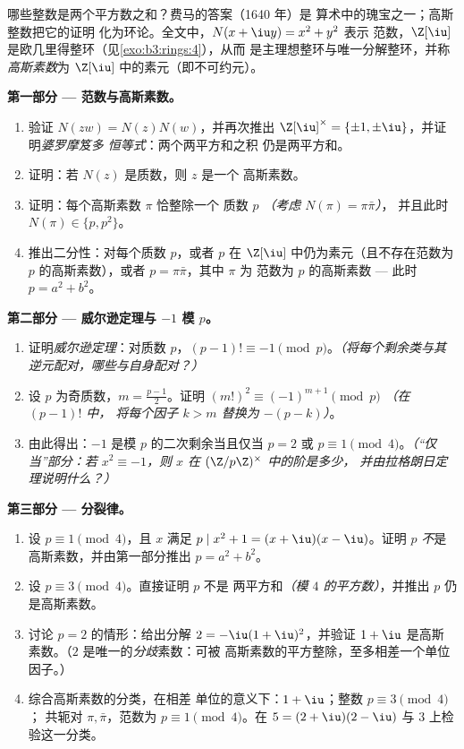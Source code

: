 \begin{problem}\label{pb:b3:rings:1}
哪些整数是两个平方数之和？费马的答案（1640 年）是
算术中的瑰宝之一；高斯整数把它的证明
化为环论。全文中，$N(x + \iu y) = x^2 + y^2$ 表示
范数，$\Z[\iu]$ 是欧几里得整环（见\cref{exo:b3:rings:4}），从而
是主理想整环与唯一分解整环，并称\emph{高斯素数}为
$\Z[\iu]$ 中的素元（即不可约元）。

\medskip
\noindent\textbf{第一部分 --- 范数与高斯素数。}
\begin{enumerate}
  \item 验证 $N(zw) = N(z)N(w)$，并再次推出 $\Z[\iu]^\times =
        \{\pm1, \pm\iu\}$，并证明\emph{婆罗摩笈多
        恒等式}：两个两平方和之积
        仍是两平方和。
  \item 证明：若 $N(z)$ 是质数，则 $z$ 是一个
        高斯素数。
  \item 证明：每个高斯素数 $\pi$ 恰整除一个
        质数 $p$ \emph{（考虑 $N(\pi) = \pi\bar\pi$）}，
        并且此时 $N(\pi) \in \{p, p^2\}$。
  \item 推出二分性：对每个质数 $p$，或者 $p$
        在 $\Z[\iu]$ 中仍为素元（且不存在范数为
        $p$ 的高斯素数），或者 $p = \pi\bar\pi$，其中 $\pi$ 为
        范数为 $p$ 的高斯素数 --- 此时 $p = a^2 + b^2$。
\end{enumerate}

\medskip
\noindent\textbf{第二部分 --- 威尔逊定理与 $-1$ 模
$p$。}
\begin{enumerate}[resume]
  \item 证明\emph{威尔逊定理}：对质数 $p$，$(p-1)!
        \equiv -1 \pmod p$。\emph{（将每个剩余类与其
        逆元配对，哪些与自身配对？）}
  \item 设 $p$ 为奇质数，$m = \frac{p-1}2$。证明
        $(m!)^2 \equiv (-1)^{m+1} \pmod p$ \emph{（在 $(p-1)!$ 中，
        将每个因子 $k > m$ 替换为 $-(p - k)$）}。
  \item 由此得出：$-1$ 是模 $p$ 的二次剩余当且仅当 $p = 2$ 或 $p
        \equiv 1 \pmod 4$。\emph{（“仅当”部分：若 $x^2
        \equiv -1$，则 $x$ 在 $(\Z/p\Z)^\times$ 中的阶是多少，
        并由拉格朗日定理说明什么？）}
\end{enumerate}

\medskip
\noindent\textbf{第三部分 --- 分裂律。}
\begin{enumerate}[resume]
  \item 设 $p \equiv 1 \pmod 4$，且 $x$ 满足 $p \mid x^2 + 1 =
        (x + \iu)(x - \iu)$。证明 $p$ \emph{不}是
        高斯素数，并由第一部分推出 $p = a^2 + b^2$。
  \item 设 $p \equiv 3 \pmod 4$。直接证明 $p$ 不是
        两平方和\emph{（模 $4$ 的平方数）}，并推出
        $p$ 仍是高斯素数。
  \item 讨论 $p = 2$ 的情形：给出分解 $2 =
        -\iu(1+\iu)^2$，并验证 $1 + \iu$ 是高斯
        素数。（$2$ 是唯一的\emph{分歧}素数：可被
        高斯素数的平方整除，至多相差一个单位因子。）
  \item 综合高斯素数的分类，在相差
        单位的意义下：$1 + \iu$；整数 $p \equiv 3 \pmod 4$；
        共轭对 $\pi, \bar\pi$，范数为 $p \equiv 1 \pmod
        4$。在 $5 = (2+\iu)(2-\iu)$ 与 $3$ 上检验这一分类。
\end{enumerate}


\end{problem}
